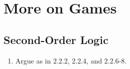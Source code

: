 \setcounter{chapter}{2}
\chapter{More on Games}
\section{Second-Order Logic}
\begin{enumerate}[1.]
%
\item {} Argue as in 2.2.2, 2.2.4, and 2.2.6-8.
%
\end{enumerate}


